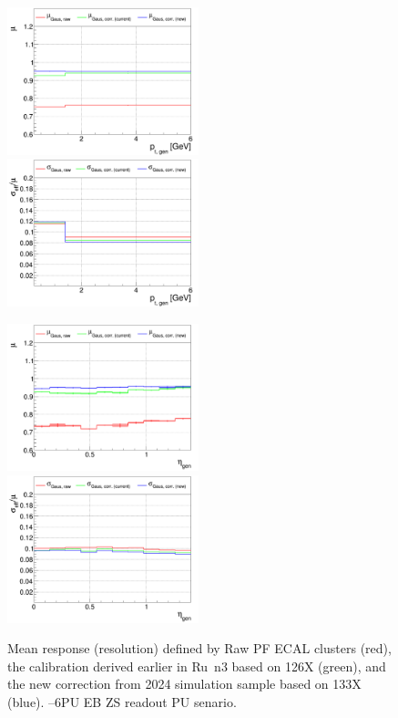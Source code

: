 \begin{figure}
\includegraphics[width=0.495\textwidth]{./plots_pdf/ECAL_plots/plotsPU/EB/ZS/pdf/GENPT/EBZS_GENPT_0000_0006_MuOverBins.pdf}
\includegraphics[width=0.495\textwidth]{./plots_pdf/ECAL_plots/plotsPU/EB/ZS/pdf/GENPT/EBZS_GENPT_0000_0006_EffSigmaOverBins.pdf}

\includegraphics[width=0.495\textwidth]{./plots_pdf/ECAL_plots/plotsPU/EB/ZS/pdf/GENETA/EBZS_GENETA_0000_0006_MuOverBins.pdf}
\includegraphics[width=0.495\textwidth]{./plots_pdf/ECAL_plots/plotsPU/EB/ZS/pdf/GENETA/EBZS_GENETA_0000_0006_EffSigmaOverBins.pdf}
\caption[$\mu$ ($\sigma_\mathrm{eff}$) vs \pt of PF ECAL cluster - EB ZS readout PU  senario]{Mean response (resolution) defined by Raw PF ECAL clusters (red), the calibration derived earlier in Ru\
n3 based on 126X (green), and the new correction from 2024 simulation sample based on 133X (blue). --6\GeV PU EB ZS readout PU senario.}
\label{fig:PU_EBZS}
\end{figure}

